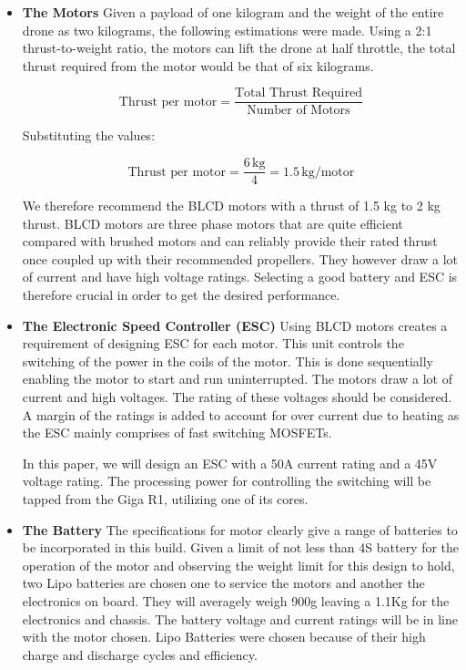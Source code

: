 \begin{itemize}
    \item \textbf{The Motors}
    Given a payload of one kilogram and the weight of the entire drone as two kilograms, the following estimations were made. Using a 2:1 thrust-to-weight ratio, the motors can lift the drone at half throttle, the total thrust required from the motor would be that of six kilograms.
    
    \[
    \text{Thrust per motor} = \frac{\text{Total Thrust Required}}{\text{Number of Motors}}
    \]
    
    Substituting the values:
    
    \[
    \text{Thrust per motor} = \frac{6 \, \text{kg}}{4} = 1.5 \, \text{kg/motor}
    \]
    
    We therefore recommend the BLCD motors with a thrust of 1.5 kg to 2 kg thrust. BLCD motors are three phase motors that are quite efficient compared with brushed motors and can reliably provide their rated thrust once coupled up with their recommended propellers. They however draw a lot of current and have high voltage ratings. Selecting a good battery and ESC is therefore crucial in order to get the desired performance.

    \item \textbf{The Electronic Speed Controller (ESC)}
    Using BLCD motors creates a requirement of designing ESC for each motor. This unit controls the switching of the power in the coils of the motor. This is done sequentially enabling the motor to start and run uninterrupted. The motors draw a lot of current and high voltages. The rating of these voltages should be considered. A margin of the ratings is added to account for over current due to heating as the ESC mainly comprises of fast switching MOSFETs.
    
    In this paper, we will design an ESC with a 50A current rating and a 45V voltage rating. The processing power for controlling the switching will be tapped from the Giga R1, utilizing one of its cores.

    \item \textbf{The Battery}
    The specifications for motor clearly give a range of batteries to be incorporated in this build. Given a limit of not less than 4S battery for the operation of the motor and observing the weight limit for this design to hold, two Lipo batteries are chosen one to service the motors and another the electronics on board. They will averagely weigh 900g leaving a 1.1Kg for the electronics and chassis. The battery voltage and current ratings will be in line with the motor chosen. Lipo Batteries were chosen because of their high charge and discharge cycles and efficiency.


\end{itemize}
